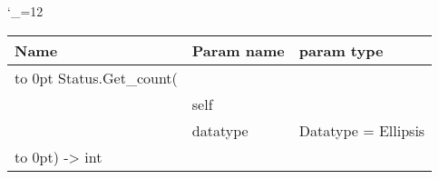 \begingroup \catcode`\_=12 \tt
\begin{tabular}{lll}
\toprule
\textrm{Name}&\textrm{Param name}&\textrm{param type}\\
\midrule
\hbox to 0pt {Status.Get_count(\hss}\\
& self\\
& datatype & Datatype = Ellipsis\\
\hbox to 0pt{) -> int\hss}\\
\bottomrule
\end{tabular}
\endgroup
